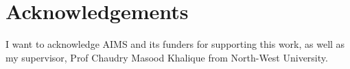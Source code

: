 \chapter*{Acknowledgements}

I want to acknowledge AIMS and its funders for supporting this work, as well as my supervisor, Prof Chaudry Masood Khalique from North-West University.


